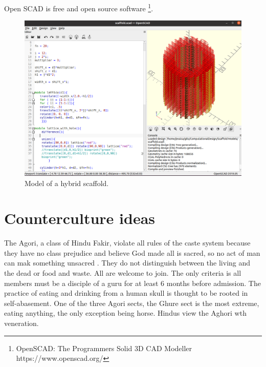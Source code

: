 \documentclass[a4paper,11pt]{article}
\begin{document}
Open SCAD is free and open source software \footnote{
OpenSCAD: The Programmers Solid 3D CAD Modeller https://www.openscad.org/}.

\begin{figure}
  \includegraphics[width=\linewidth]{day05.png}
  \caption{Model of a hybrid scaffold.}
  \label{fig:boat1}
\end{figure}

\section{Counterculture ideas}

The Agori, a class of Hindu Fakir, violate all rules of the caste system because they have no class prejudice and believe God made all is sacred, so no act of man can mak something unsacred \cite{balfour1897life}. They do not distinguish between the living and the dead or food and waste. All are welcome to join. The only criteria is all members must be a disciple of a guru for at least 6 months before admission. The practice of eating and drinking from a human skull is thought to be rooted in self-abasement. One of the three Agori sects, the Ghure sect is the most extreme, eating anything, the only exception being horse. Hindus view the Aghori wth veneration.





\newpage
\end{document}
